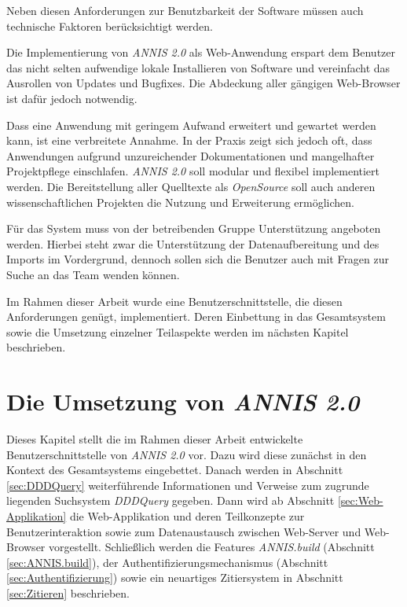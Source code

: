 Neben diesen Anforderungen zur Benutzbarkeit der Software müssen auch technische Faktoren berücksichtigt werden.

\begin{description}
	\item[Implementierung als Web-Anwendung]{Die Implementierung von \emph{ANNIS 2.0} als Web-Anwendung erspart dem Benutzer das nicht selten aufwendige lokale Installieren von Software und vereinfacht das Ausrollen von Updates und Bugfixes. Die Abdeckung aller gängigen Web-Browser ist dafür jedoch notwendig.	
	\item[Erweiterbarkeit/Wartbarkeit]{Dass eine Anwendung mit geringem Aufwand erweitert und gewartet werden kann, ist eine verbreitete Annahme. In der Praxis zeigt sich jedoch oft, dass Anwendungen aufgrund unzureichender Dokumentationen und mangelhafter Projektpflege einschlafen. \emph{ANNIS 2.0} soll modular und flexibel implementiert werden. Die Bereitstellung aller Quelltexte als \emph{OpenSource} soll auch anderen wissenschaftlichen Projekten die Nutzung und Erweiterung ermöglichen.}
	\item[Unterstützung]{Für das System muss von der betreibenden Gruppe Unterstützung angeboten werden. Hierbei steht zwar die Unterstützung der Datenaufbereitung und des Imports im Vordergrund, dennoch sollen sich die Benutzer auch mit Fragen zur Suche an das Team wenden können.}
}
\end{description}

Im Rahmen dieser Arbeit wurde eine Benutzerschnittstelle, die diesen Anforderungen genügt, implementiert. Deren Einbettung in das Gesamtsystem sowie die Umsetzung einzelner Teilaspekte werden im nächsten Kapitel beschrieben.

\newpage
\section{Die Umsetzung von \emph{ANNIS 2.0}}\label{sec:ANNIS 2.0}

Dieses Kapitel stellt die im Rahmen dieser Arbeit entwickelte Benutzerschnittstelle von \emph{ANNIS 2.0} vor. Dazu wird diese zunächst in den Kontext des Gesamtsystems eingebettet. Danach werden in Abschnitt \ref{sec:DDDQuery} weiterführende Informationen und Verweise zum zugrunde liegenden Suchsystem \emph{DDDQuery} gegeben. Dann wird ab Abschnitt \ref{sec:Web-Applikation} die Web-Applikation und deren Teilkonzepte zur Benutzerinteraktion sowie zum Datenaustausch zwischen Web-Server und Web-Browser vorgestellt. Schließlich werden die Features \emph{ANNIS.build} (Abschnitt \ref{sec:ANNIS.build}), der Authentifizierungsmechanismus (Abschnitt \ref{sec:Authentifizierung}) sowie ein neuartiges Zitiersystem in Abschnitt \ref{sec:Zitieren} beschrieben.

